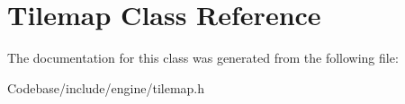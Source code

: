 \hypertarget{class_tilemap}{\section{Tilemap Class Reference}
\label{class_tilemap}
}


The documentation for this class was generated from the following file\-:\begin{DoxyCompactItemize}
\item 
Codebase/include/engine/tilemap.\-h\end{DoxyCompactItemize}
